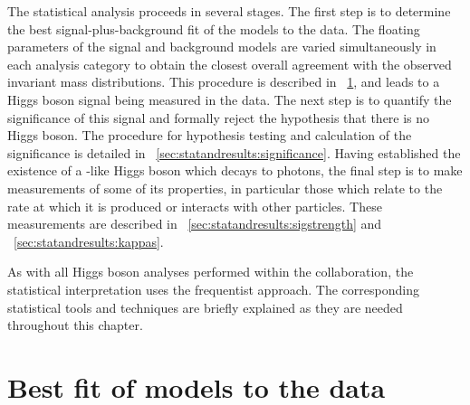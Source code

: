 The statistical analysis proceeds in several stages. The first step is to determine the best signal-plus-background fit of the models to the data. The floating parameters of the signal and background models are varied simultaneously in each analysis category to obtain the closest overall agreement with the observed invariant mass distributions. This procedure is described in \Sec~\ref{sec:statandresults:bestfit}, and leads to a Higgs boson signal being measured in the data. The next step is to quantify the significance of this signal and formally reject the hypothesis that there is no Higgs boson. The procedure for hypothesis testing and calculation of the significance is detailed in \Sec~\ref{sec:statandresults:significance}. Having established the existence of a \SM-like Higgs boson which decays to photons, the final step is to make measurements of some of its properties, in particular those which relate to the rate at which it is produced or interacts with other \SM particles. These measurements are described in \Sec~\ref{sec:statandresults:sigstrength} and \Sec~\ref{sec:statandresults:kappas}. 
 
As with all Higgs boson analyses performed within the \CMS collaboration, the statistical interpretation uses the frequentist approach. The corresponding statistical tools and techniques are briefly explained as they are needed throughout this chapter.

\section{Best fit of models to the data}
\label{sec:statandresults:bestfit}

